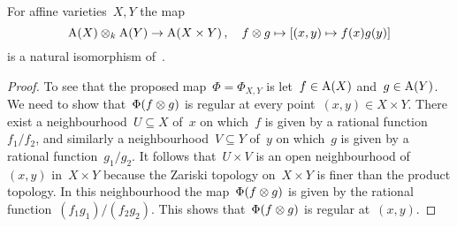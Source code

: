 \begin{lemma}
  \label{coordinate ring of product of qaffine}
  For affine varieties~$X,Y$ the map
  \[
            \operatorname{A}(X) \mathbin{\otimes}_k \operatorname{A}(Y)
    \to     \operatorname{A}(X \times Y) \,,
    \quad   f \mathbin{\otimes} g
    \mapsto [(x, y) \mapsto f(x) g(y)]
  \]
  is a  natural isomorphism of~.
\end{lemma}


\begin{proof}
  To see that the proposed map~$\Phi = \Phi_{X,Y}$ is  let~$f \in \operatorname{A}(X)$ and~$g \in \operatorname{A}(Y)$.
  We need to show that~$\Phi(f \mathbin{\otimes} g)$ is regular at every point~$(x,y) \in X \times Y$.
  There exist a neighbourhood~$U \subseteq X$ of~$x$ on which~$f$ is given by a rational function~$f_1/f_2$, and similarly a neighbourhood~$V \subseteq Y$ of~$y$ on which~$g$ is given by a rational function~$g_1/g_2$.
  It follows that~$U \times V$ is an open neighbourhood of~$(x,y)$ in~$X \times Y$ because the Zariski topology on~$X \times Y$ is finer than the product topology.
  In this neighbourhood the map~$\Phi(f \mathbin{\otimes} g)$ is given by the rational function~$(f_1 g_1) / (f_2 g_2)$.
  This shows that~$\Phi(f \mathbin{\otimes} g)$ is regular at~$(x,y)$.
  

\end{proof}
